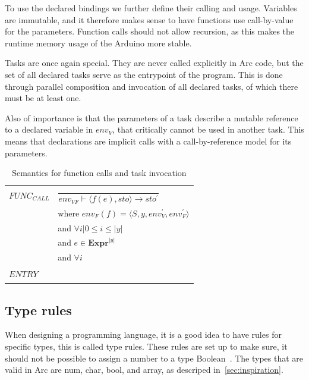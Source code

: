 To use the declared bindings we further define their calling and usage. Variables are immutable, and it therefore makes sense to have functions use call-by-value for the parameters. Function calls should not allow recursion, as this makes the runtime memory usage of the Arduino more stable.

Tasks are once again special. They are never called explicitly in Arc code, but the set of all declared tasks serve as the entrypoint of the program. This is done through parallel composition and invocation of all declared tasks, of which there must be at least one.

Also of importance is that the parameters of a task describe a mutable reference to a declared variable in $env_V$, that critically cannot be used in another task. This means that declarations are implicit calls with a call-by-reference model for its parameters.


\begin{table}[htb!]
    \centering
    \begin{tabular}{ll}
        \toprule
        $FUNC_{CALL}$ & $\dfrac{}{env_{VF} \vdash \langle f(e), sto\rangle \rightarrow sto^\prime}$ \\ [12pt]
                      & where $env_F(f) = \langle S, y, env^\prime_V, env^\prime_F \rangle$         \\
                      & and $\forall i | 0 \leq i \leq |y|$                                         \\
                      & and $e \in \textbf{Expr}^{ |y| }$                                           \\
                      & and $\forall i $                                                            \\

        $ENTRY$       & $\dfrac{}{}$                                                                \\ [12pt]
        \bottomrule
    \end{tabular}
    \caption{Semantics for function calls and task invocation}
    \label{tab:unfinished}
\end{table}


\subsection{Type rules}\label{subsec:typerules}
When designing a programming language, it is a good idea to have rules for specific types, this is called type rules. These rules are set up to make sure, it should not be possible to assign a number to a type Boolean~\cite{Sebesta2016}. The types that are valid in Arc are num, char, bool, and array, as descriped in~\ref{sec:inspiration}.

